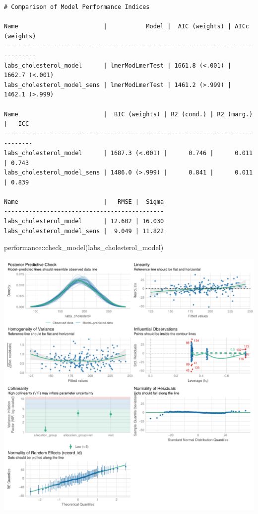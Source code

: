 \documentclass[
  letterpaper,
  DIV=11,
  numbers=noendperiod]{scrartcl}
\newenvironment{Shaded}{\begin{snugshade}}{\end{snugshade}}
\newcommand{\FunctionTok}[1]{\textcolor[rgb]{0.28,0.35,0.67}{#1}}
\newcommand{\NormalTok}[1]{\textcolor[rgb]{0.00,0.23,0.31}{#1}}
\newcommand{\SpecialCharTok}[1]{\textcolor[rgb]{0.37,0.37,0.37}{#1}}
\begin{document}
\begin{verbatim}
# Comparison of Model Performance Indices

Name                        |           Model |  AIC (weights) | AICc (weights)
-------------------------------------------------------------------------------
labs_cholesterol_model      | lmerModLmerTest | 1661.8 (<.001) | 1662.7 (<.001)
labs_cholesterol_model_sens | lmerModLmerTest | 1461.2 (>.999) | 1462.1 (>.999)

Name                        |  BIC (weights) | R2 (cond.) | R2 (marg.) |   ICC
------------------------------------------------------------------------------
labs_cholesterol_model      | 1687.3 (<.001) |      0.746 |      0.011 | 0.743
labs_cholesterol_model_sens | 1486.0 (>.999) |      0.841 |      0.011 | 0.839

Name                        |   RMSE |  Sigma
---------------------------------------------
labs_cholesterol_model      | 12.602 | 16.030
labs_cholesterol_model_sens |  9.049 | 11.822
\end{verbatim}

\begin{Shaded}
\begin{Highlighting}[]
\NormalTok{performance}\SpecialCharTok{::}\FunctionTok{check\_model}\NormalTok{(labs\_cholesterol\_model)}
\end{Highlighting}
\end{Shaded}

\includegraphics{Outcomes_V1V2V3_files/figure-pdf/labs_cholesterol_4-1.pdf}
\end{document}
